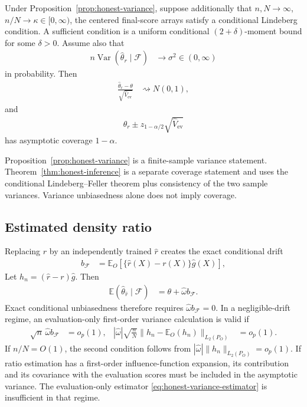 \begin{theorem}
\label{thm:honest-inference}
Under Proposition~\ref{prop:honest-variance}, suppose additionally that $n,N\to\infty$, $n/N\to\kappa\in[0,\infty)$, the centered final-score arrays satisfy a conditional Lindeberg condition. A sufficient condition is a uniform conditional $(2+\delta)$-moment bound for some $\delta>0$. Assume also that
\begin{align}
n\operatorname{Var}(\widehat\theta_r\mid\mathcal F)
&\to
\sigma^2\in(0,\infty)
\end{align}
in probability. Then
\begin{align}
\frac{\widehat\theta_r-\theta}{\sqrt{\widehat V_{\mathrm{ev}}}}
&\rightsquigarrow
N(0,1),
\label{eq:honest-studentized-clt}
\end{align}
and
\begin{align}
\widehat\theta_r
\pm
z_{1-\alpha/2}\sqrt{\widehat V_{\mathrm{ev}}}
\label{eq:honest-wald}
\end{align}
has asymptotic coverage $1-\alpha$.
\end{theorem}

Proposition~\ref{prop:honest-variance} is a finite-sample variance statement. Theorem~\ref{thm:honest-inference} is a separate coverage statement and uses the conditional Lindeberg--Feller theorem plus consistency of the two sample variances. Variance unbiasedness alone does not imply coverage.

\subsection{Estimated density ratio}

Replacing $r$ by an independently trained $\widehat r$ creates the exact conditional drift
\begin{align}
b_{\mathcal F}
&=
\mathbb E_O[\{\widehat r(X)-r(X)\}\widehat{g}(X)],
\label{eq:ratio-drift}
\end{align}
Let $h_n=(\widehat r-r)\widehat{g}$. Then
\begin{align}
\mathbb E(\widehat\theta_{\widehat r}\mid\mathcal F)
&=
\theta+\widehat\omega b_{\mathcal F}.
\end{align}
Exact conditional unbiasedness therefore requires $\widehat\omega b_{\mathcal F}=0$. In a negligible-drift regime, an evaluation-only first-order variance calculation is valid if
\begin{align}
\sqrt n\,\widehat\omega b_{\mathcal F}
&=o_p(1),
&
|\widehat\omega|
\sqrt{\frac nN}
\|h_n-\mathbb E_O(h_n)\|_{L_2(P_O)}
&=o_p(1).
\label{eq:ratio-negligible}
\end{align}
If $n/N=O(1)$, the second condition follows from $|\widehat\omega|\|h_n\|_{L_2(P_O)}=o_p(1)$.
If ratio estimation has a first-order influence-function expansion, its contribution and its covariance with the evaluation scores must be included in the asymptotic variance. The evaluation-only estimator \eqref{eq:honest-variance-estimator} is insufficient in that regime.

